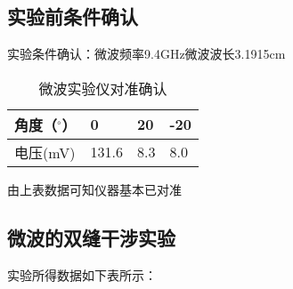 \documentclass[UTF-8,twoside,cs4size]{ctexart}
\begin{document}
\subsection{实验前条件确认}
实验条件确认：微波频率9.4GHz\quad 微波波长3.1915cm
\begin{table}[!h]
    \centering
    \caption{微波实验仪对准确认}
    \begin{tabular}{|l|l|l|l|}
    \hline
        角度（$^{\circ}$） & 0 & 20 & -20 \\ \hline
        电压(mV) & 131.6 & 8.3 & 8.0 \\ \hline
    \end{tabular}
\end{table}
由上表数据可知仪器基本已对准
\subsection{微波的双缝干涉实验}
实验所得数据如下表所示：
\newpage
\end{document}
